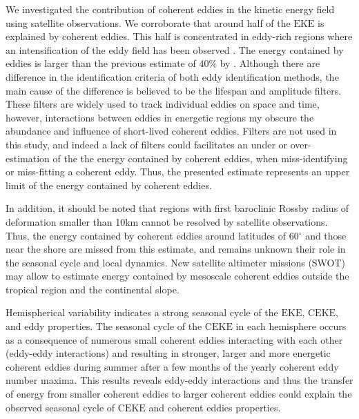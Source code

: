 \documentclass[draft,linenumbers]{agujournal2019}
\newcommand{\EKE}{\textrm{EKE}}
\newcommand{\CEKE}{\textrm{CEKE}}
\begin{document}
	We investigated the contribution of coherent eddies in the kinetic energy field using satellite observations. 
	We corroborate that around half of the $\EKE$ is explained by coherent eddies. 
	This half is concentrated in eddy-rich regions where an intensification of the eddy field has been observed \citep{Martinez_Kinetic_2021}. The energy contained by eddies is larger than the previous estimate of 40\% by \citet{Chelton_The_2011}.
	Although there are difference in the identification criteria of both eddy identification methods, the main cause of the difference is believed to be the lifespan and amplitude filters. 
	These filters are widely used to track individual eddies on space and time, however, interactions between eddies in energetic regions my obscure the abundance and influence of short-lived coherent eddies. 
	Filters are not used in this study, and indeed a lack of filters could facilitates an under or over-estimation of the the energy contained by coherent eddies, when miss-identifying or miss-fitting a coherent eddy. 
	Thus, the presented estimate represents an upper limit of the energy contained by coherent eddies. 

	In addition, it should be noted that regions with first baroclinic Rossby radius of deformation smaller than 10km cannot be resolved by satellite observations. 
	Thus, the energy contained by coherent eddies around latitudes of 60$^\circ$ and those near the shore are missed from this estimate, and remains unknown their role in the seasonal cycle and local dynamics. New satellite altimeter missions (SWOT) may allow to estimate energy contained by mesoscale coherent eddies outside the tropical region and the continental slope.

	Hemispherical variability indicates a strong seasonal cycle of the $\EKE$, $\CEKE$, and eddy properties. 
	The seasonal cycle of the $\CEKE$ in each hemisphere occurs as a consequence of numerous small coherent eddies interacting with each other (eddy-eddy interactions) and resulting in stronger, larger and more energetic coherent eddies during summer after a few months of the yearly coherent eddy number maxima.
	This results reveals eddy-eddy interactions and thus the transfer of energy from smaller coherent eddies to larger coherent eddies could explain the observed seasonal cycle of $\CEKE$ and coherent eddies properties.
	
\end{document}
